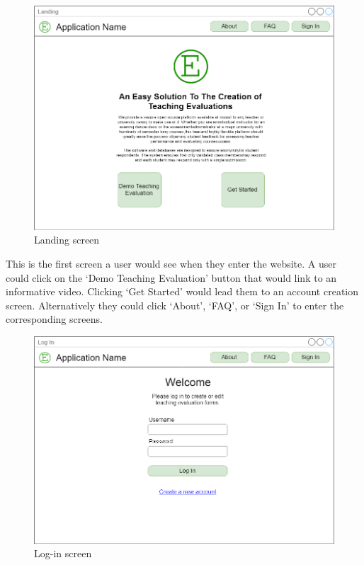 \documentclass{article}
\begin{document}
\begin{center}
\begin{figure}[H]
    \centering
    \caption{Landing screen}
    \includegraphics[scale=.35]{images/landing_screen.png}
\end{figure}
\end{center}

This is the first screen a user would see when they enter the website. A user could click on the `Demo Teaching Evaluation' button that would link to an informative video. Clicking `Get Started' would lead them to an account creation screen. Alternatively they could click `About', `FAQ', or `Sign In' to enter the corresponding screens.

\begin{center}
\begin{figure}[H]
    \centering
    \caption{Log-in screen}
    \includegraphics[scale=.35]{images/login_screen.png}
\end{figure}
\end{center}
\end{document}
